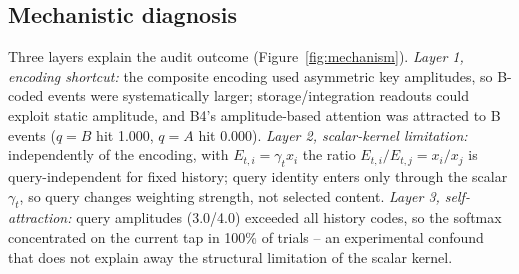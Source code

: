 \subsection{Mechanistic diagnosis}\label{sec:res-mechanism}

Three layers explain the audit outcome (Figure~\ref{fig:mechanism}).
\textit{Layer 1, encoding shortcut:} the composite encoding used
asymmetric key amplitudes, so B-coded events were systematically larger;
storage/integration readouts could exploit static amplitude, and B4's
amplitude-based attention was attracted to B events ($q=B$ hit 1.000,
$q=A$ hit 0.000).  \textit{Layer 2, scalar-kernel limitation:}
independently of the encoding, with $E_{t,i} = \gamma_t x_i$ the ratio
$E_{t,i}/E_{t,j} = x_i/x_j$ is query-independent for fixed history;
query identity enters only through the scalar $\gamma_t$, so query
changes weighting strength, not selected content.  \textit{Layer 3,
self-attraction:} query amplitudes (3.0/4.0) exceeded all history codes,
so the softmax concentrated on the current tap in 100\% of trials -- an
experimental confound that does not explain away the structural
limitation of the scalar kernel.
